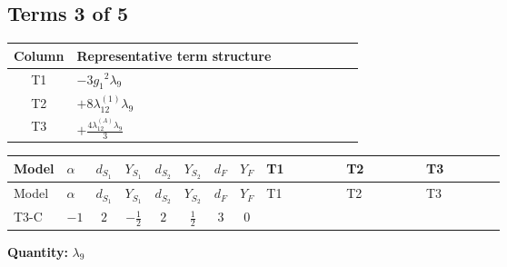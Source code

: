 \documentclass[8pt]{article}
\begin{document}
\begin{landscape}
\subsection*{Terms 3 of 5}
\begin{center}
\begin{tabular}{@{}c >{\raggedright\arraybackslash}p{0.82\linewidth}@{}}
\toprule
Column & Representative term structure \\
\midrule
T1 & \(\displaystyle -3 {g_1}^2 {\lambda_{9}}\) \\
\midrule
T2 & \(\displaystyle +8 {\lambda_{12}^{(1)}} {\lambda_{9}}\) \\
\midrule
T3 & \(\displaystyle +\frac{4 {\lambda_{12}^{(A)}} {\lambda_{9}}}{3}\) \\
\midrule
\bottomrule
\end{tabular}
\end{center}
\smallskip
\tiny
\begin{longtable}{@{}llcccccc >{\raggedright\arraybackslash}p{0.21\linewidth} >{\raggedright\arraybackslash}p{0.21\linewidth} >{\raggedright\arraybackslash}p{0.21\linewidth}@{}}
\toprule
Model & $\alpha$ & $d_{S_1}$ & $Y_{S_1}$ & $d_{S_2}$ & $Y_{S_2}$ & $d_F$ & $Y_F$ & T1 & T2 & T3 \\
\midrule
\endfirsthead
\toprule
Model & $\alpha$ & $d_{S_1}$ & $Y_{S_1}$ & $d_{S_2}$ & $Y_{S_2}$ & $d_F$ & $Y_F$ & T1 & T2 & T3 \\
\midrule
\endhead
T3-C & $-1$ & $2$ & $-\frac{1}{2}$ & $2$ & $\frac{1}{2}$ & $3$ & $0$ & \scriptsize\adjustbox{max width=\linewidth}{$\begin{gathered} -3 {g_1}^2 {\lambda_{9}}\end{gathered}$} & \scriptsize\adjustbox{max width=\linewidth}{$\begin{gathered} +8 {\lambda_{12}^{(1)}} {\lambda_{9}}\end{gathered}$} & \scriptsize\adjustbox{max width=\linewidth}{$\begin{gathered} +\frac{4 {\lambda_{12}^{(A)}} {\lambda_{9}}}{3}\end{gathered}$} \\
\midrule
\bottomrule
\end{longtable}
\clearpage
\noindent\textbf{Quantity: }$\lambda_{9}$\par\smallskip

\end{landscape}
\end{document}
